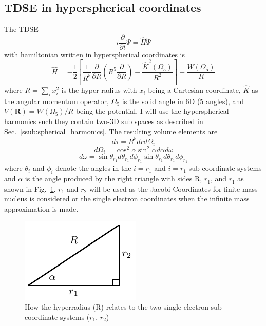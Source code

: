 \subsection{TDSE in hyperspherical coordinates} %
\label{sub:tdse_in_hyperspherical_coordinates}
The TDSE
\begin{equation}
    i\frac{\partial}{\partial t}\Psi = \hat{H}\Psi
\end{equation}
with hamiltonian written in hyperspherical coordinates is
\begin{equation}
   \hat{H} = -\frac{1}{2} \left[\frac{1}{R^5}\frac{\partial}{\partial R}\left(R^5\frac{\partial}{\partial R}\right) - \frac{\hat{K}^2(\Omega_5)}{R^2}\right] + \frac{W(\Omega_5)}{R}
\end{equation}
where $R=\sum_i x_i^2$ is the hyper radius with $x_i$ being a Cartesian coordinate, $\hat{K}$ as the angular momentum operator, $\Omega_5$ is the solid angle in 6D (5 angles), and $V(\mathbf{R}) = W(\Omega_5)/R$ being the potential. I will use the hyperspherical harmonics such they contain two-3D sub spaces as described in Sec.~\ref{ssub:spherical_harmonics}. 
The resulting volume elements are 
\begin{equation}
    d\tau = R^5 dr d\Omega_i
\end{equation}
\begin{equation}
    d\Omega_i = \cos^2\alpha \sin^2\alpha d\alpha d\omega
\end{equation}
\begin{equation}
    d\omega = \sin\theta_{r_1} d\theta_{r_1} d\phi_{r_1} \sin\theta_{r_1} d\theta_{r_1} d\phi_{r_1}
\end{equation}
where $\theta_i$ and $\phi_i$ denote the angles in the $i={r_1}$ and $i={r_1}$ sub coordinate systems and $\alpha$ is the angle produced by the right triangle with sides R, ${r_1}$, and ${r_1}$ as shown in Fig.~\ref{fig:hyperradius}. $r_1$ and $r_2$ will be used as the Jacobi Coordinates for finite mass nucleus is considered or the single electron coordinates when the infinite mass approximation is made.
\begin{figure}[h!]
\centering
\includegraphics[width=0.3\linewidth]{figs/Two_electron/hyperradius.pdf}
\caption{How the hyperradius (R) relates to the two single-electron sub coordinate systems ($r_1$, $r_2$)} 
  \label{fig:hyperradius}
\end{figure}

